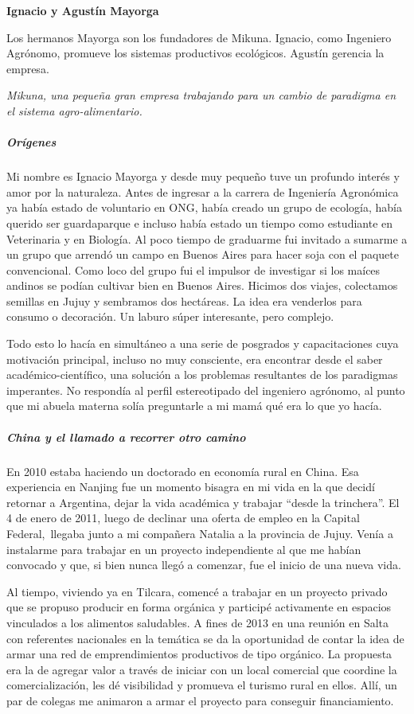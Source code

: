 \documentclass[
]{article}
\begin{document}
\textbf{Ignacio y Agustín Mayorga}

Los hermanos Mayorga son los fundadores de Mikuna. Ignacio, como
Ingeniero Agrónomo, promueve los sistemas productivos ecológicos.
Agustín gerencia la empresa.

\emph{Mikuna, una pequeña gran empresa trabajando para un cambio de
paradigma en el sistema agro-alimentario.}

\hypertarget{oruxedgenes}{%
\subparagraph{Orígenes}\label{oruxedgenes}}

Mi nombre es Ignacio Mayorga y desde muy pequeño tuve un profundo
interés y amor por la naturaleza. Antes de ingresar a la carrera de
Ingeniería Agronómica ya había estado de voluntario en ONG, había creado
un grupo de ecología, había querido ser guardaparque e incluso había
estado un tiempo como estudiante en Veterinaria y en Biología. Al poco
tiempo de graduarme fui invitado a sumarme a un grupo que arrendó un
campo en Buenos Aires para hacer soja con el paquete convencional. Como
loco del grupo fui el impulsor de investigar si los maíces andinos se
podían cultivar bien en Buenos Aires. Hicimos dos viajes, colectamos
semillas en Jujuy y sembramos dos hectáreas. La idea era venderlos para
consumo o decoración. Un laburo súper interesante, pero complejo.

Todo esto lo hacía en simultáneo a una serie de posgrados y
capacitaciones cuya motivación principal, incluso no muy consciente, era
encontrar desde el saber académico-científico, una solución a los
problemas resultantes de los paradigmas imperantes. No respondía al
perfil estereotipado del ingeniero agrónomo, al punto que mi abuela
materna solía preguntarle a mi mamá qué era lo que yo hacía.

\hypertarget{china-y-el-llamado-a-recorrer-otro-camino}{%
\subparagraph{China y el llamado a recorrer otro
camino}\label{china-y-el-llamado-a-recorrer-otro-camino}}

En 2010 estaba haciendo un doctorado en economía rural en China. Esa
experiencia en Nanjing fue un momento bisagra en mi vida en la que
decidí retornar a Argentina, dejar la vida académica y trabajar ``desde
la trinchera''. El 4 de enero de 2011, luego de declinar una oferta de
empleo en la Capital Federal,~llegaba junto a mi compañera Natalia a la
provincia de Jujuy. Venía a instalarme para trabajar en un proyecto
independiente al que me habían convocado y que, si bien nunca llegó a
comenzar, fue el inicio de una nueva vida.

Al tiempo, viviendo ya en Tilcara, comencé a trabajar en un proyecto
privado que se propuso producir en forma orgánica y participé
activamente en espacios vinculados a los alimentos saludables. A fines
de 2013 en una reunión en Salta con referentes nacionales en la temática
se da la oportunidad de contar la idea de armar una red de
emprendimientos productivos de tipo orgánico. La propuesta era la de
agregar valor a través de iniciar con un local comercial que coordine la
comercialización, les dé visibilidad y promueva el turismo rural en
ellos. Allí, un par de colegas me animaron a armar el proyecto para
conseguir financiamiento.
\end{document}
